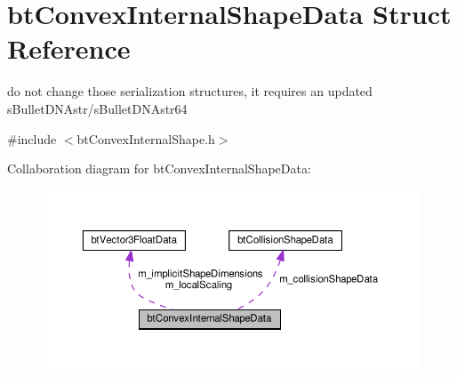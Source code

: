 \hypertarget{structbtConvexInternalShapeData}{}\section{bt\+Convex\+Internal\+Shape\+Data Struct Reference}
\label{structbtConvexInternalShapeData}


do not change those serialization structures, it requires an updated s\+Bullet\+D\+N\+Astr/s\+Bullet\+D\+N\+Astr64  




{\ttfamily \#include $<$bt\+Convex\+Internal\+Shape.\+h$>$}



Collaboration diagram for bt\+Convex\+Internal\+Shape\+Data\+:
\nopagebreak
\begin{figure}[H]
\begin{center}
\leavevmode
\includegraphics[width=350pt]{structbtConvexInternalShapeData__coll__graph}
\end{center}
\end{figure}
